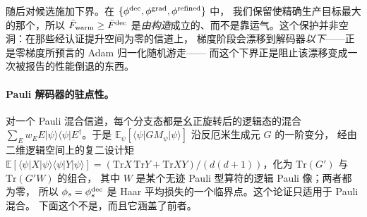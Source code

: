 \documentclass[11pt,a4paper]{article}
\newcommand{\ket}[1]{\lvert #1\rangle}
\newcommand{\bra}[1]{\langle #1\rvert}
\newcommand{\tr}{\mathrm{Tr}}
\begin{document}
随后对候选施加下界。在 $\{\phi^{\rm dec},\phi^{\rm grad},\phi^{\rm refined}\}$ 中，
我们保留使精确生产目标最大的那个，所以 $\bar F_{\rm warm}\ge\bar F^{\rm dec}$
是\emph{由构造}成立的、而不是靠运气。这个保护并非空洞：在那些经认证提升空间为零的信道上，
梯度阶段会漂移到解码器\emph{以下}——正是零梯度所预言的 Adam 归一化随机游走——
而这个下界正是阻止该漂移变成一次被报告的性能倒退的东西。

\paragraph{Pauli 解码器的驻点性。}
对一个 Pauli 混合信道，每个分支态都是幺正旋转后的逻辑态的混合
$\sum_E w_E E\ket{\psi}\bra{\psi}E^\dagger$。于是
$\mathbb{E}_\psi[\bra{\psi}G M_\psi\ket{\psi}]$ 沿反厄米生成元 $G$ 的一阶变分，
经由二维逻辑空间上的复二设计矩
$\mathbb{E}[\bra{\psi}X\ket{\psi}\bra{\psi}Y\ket{\psi}]=(\tr X\,\tr Y+
\tr XY)/(d(d+1))$，化为 $\tr(G')$ 与 $\tr(G'W)$ 的组合，
其中 $W$ 是某个无迹 Pauli 型算符的逻辑 Pauli 像；两者都为零，
所以 $\phi_s=\phi^{\rm dec}_s$ 是 Haar 平均损失的一个临界点。这个论证只适用于 Pauli 混合。
下面这个不是，而且它涵盖了前者。
\end{document}
